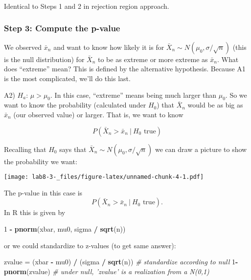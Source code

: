 \documentclass[]{article}
\newenvironment{Shaded}{\begin{snugshade}}{\end{snugshade}}
\newcommand{\CommentTok}[1]{\textcolor[rgb]{0.56,0.35,0.01}{\textit{#1}}}
\newcommand{\DecValTok}[1]{\textcolor[rgb]{0.00,0.00,0.81}{#1}}
\newcommand{\KeywordTok}[1]{\textcolor[rgb]{0.13,0.29,0.53}{\textbf{#1}}}
\newcommand{\NormalTok}[1]{#1}
\newcommand{\OperatorTok}[1]{\textcolor[rgb]{0.81,0.36,0.00}{\textbf{#1}}}
\newcommand{\StringTok}[1]{\textcolor[rgb]{0.31,0.60,0.02}{#1}}
\begin{document}
Identical to Steps 1 and 2 in rejection region approach.

\hypertarget{step-3-compute-the-p-value}{%
\subsubsection{Step 3: Compute the
p-value}\label{step-3-compute-the-p-value}}

We observed \(\bar x_n\) and want to know how likely it is for
\(\bar X_n \sim N(\mu_0, \sigma/\sqrt{n})\) (this is the null
distribution) for \(\bar X_n\) to be as extreme or more extreme as
\(\bar x_n\). What does ``extreme'' mean? This is defined by the
alternative hypothesis. Because A1 is the most complicated, we'll do
this last.

A2) \(H_{a}\): \(\mu > \mu_0\). In this case, ``extreme'' means being
much larger than \(\mu_0\). So we want to know the probability
(calculated under \(H_0\)) that \(\bar X_n\) would be as big as
\(\bar x_n\) (our observed value) or larger. That is, we want to know

\[
P(\bar X_n > \bar x_n~|~H_0\text{ true})
\]

Recalling that \(H_0\) says that
\(\bar X_n\sim N(\mu_0,\sigma/\sqrt{n})\) we can draw a picture to show
the probability we want:

\texttt{[image: lab8-3-\_files/figure-latex/unnamed-chunk-4-1.pdf]}

The p-value in this case is \[
P(\bar X_n > \bar x_n~|~H_0\text{ true}).
\] In R this is given by

\begin{Shaded}
\begin{Highlighting}[]
\DecValTok{1} \OperatorTok{-}\StringTok{ }\KeywordTok{pnorm}\NormalTok{(xbar, mu0, sigma }\OperatorTok{/}\StringTok{ }\KeywordTok{sqrt}\NormalTok{(n))}
\end{Highlighting}
\end{Shaded}

or we could standardize to z-values (to get same answer):

\begin{Shaded}
\begin{Highlighting}[]
\NormalTok{zvalue =}\StringTok{ }\NormalTok{(xbar }\OperatorTok{-}\StringTok{ }\NormalTok{mu0) }\OperatorTok{/}\StringTok{ }\NormalTok{(sigma }\OperatorTok{/}\StringTok{ }\KeywordTok{sqrt}\NormalTok{(n)) }\CommentTok{# standardize according to null}
\DecValTok{1}\OperatorTok{-}\KeywordTok{pnorm}\NormalTok{(zvalue) }\CommentTok{# under null, 'zvalue' is a realization from a N(0,1)}
\end{Highlighting}
\end{Shaded}
\end{document}
